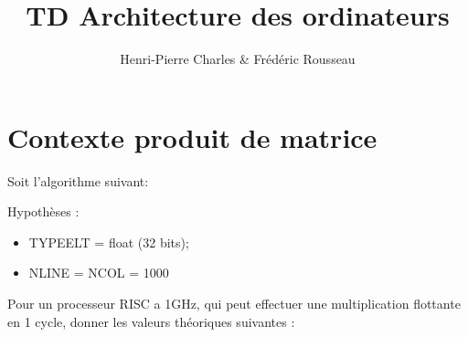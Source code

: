 \documentclass{article}
\title{TD Architecture des ordinateurs}
\author{Henri-Pierre Charles \& Frédéric Rousseau}
\begin{document}
\sffamily %
\allsectionsfont{\sffamily}
\maketitle
\section{Contexte produit de matrice}

Soit l'algorithme suivant: 


Hypothèses :
\begin{itemize}
\item TYPEELT = float (32 bits); 
\item NLINE = NCOL = 1000
\end{itemize}

Pour un processeur RISC a 1GHz, qui peut effectuer une multiplication
flottante en 1 cycle, donner les valeurs théoriques suivantes :
\end{document}
